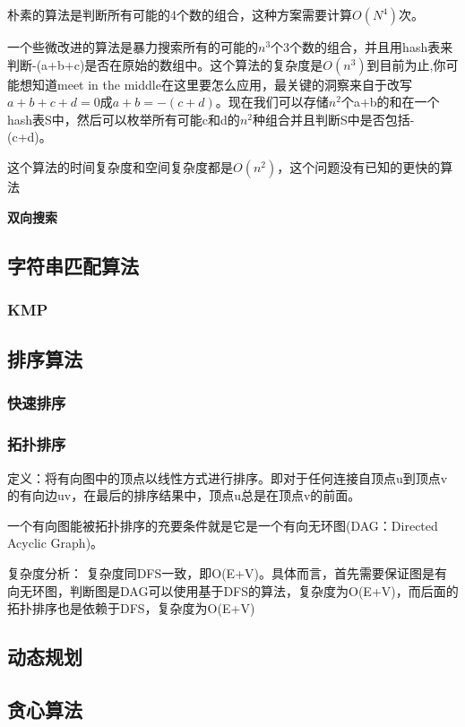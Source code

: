 \documentclass[12pt]{article}  %
\begin{document}
朴素的算法是判断所有可能的4个数的组合，这种方案需要计算$O(N^4)$次。

一个些微改进的算法是暴力搜索所有的可能的$n^3$个3个数的组合，并且用hash表来判断-(a+b+c)是否在原始的数组中。这个算法的复杂度是$O(n^3)$到目前为止,你可能想知道meet in the middle在这里要怎么应用，最关键的洞察来自于改写$a + b + c + d = 0$成$a + b = -(c + d)$。现在我们可以存储$n^2$个a+b的和在一个hash表S中，然后可以枚举所有可能c和d的$n^2$种组合并且判断S中是否包括-(c+d)。

 这个算法的时间复杂度和空间复杂度都是$O(n^2)$，这个问题没有已知的更快的算法

\textbf{双向搜索}

\subsection{字符串匹配算法}

\subsubsection{KMP}

\subsection{排序算法}

\subsubsection{快速排序}

\subsubsection{拓扑排序}

定义：将有向图中的顶点以线性方式进行排序。即对于任何连接自顶点u到顶点v的有向边uv，在最后的排序结果中，顶点u总是在顶点v的前面。

一个有向图能被拓扑排序的充要条件就是它是一个有向无环图(DAG：Directed Acyclic Graph)。


复杂度分析：
复杂度同DFS一致，即O(E+V)。具体而言，首先需要保证图是有向无环图，判断图是DAG可以使用基于DFS的算法，复杂度为O(E+V)，而后面的拓扑排序也是依赖于DFS，复杂度为O(E+V)

\subsection{动态规划}

\subsection{贪心算法}
\end{document}

